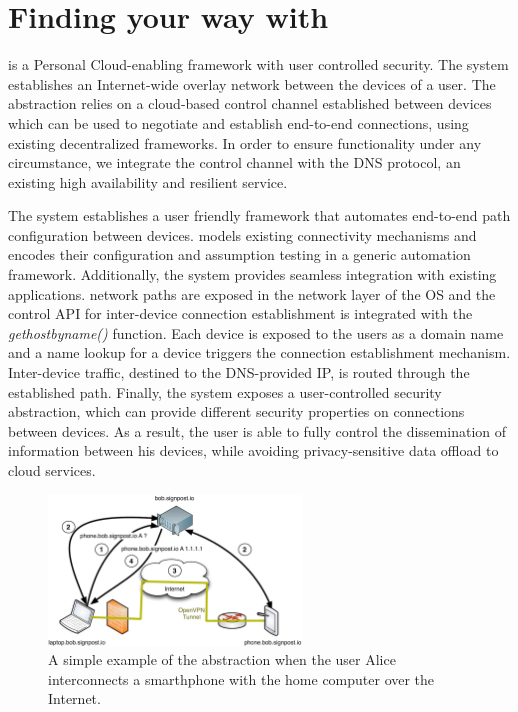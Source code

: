\section{Finding your way with \signpost}\label{sec:sp-signpost}

\signpost is a Personal Cloud-enabling framework with user controlled security.
The system establishes an Internet-wide overlay network between the devices of a
user. The abstraction relies on a cloud-based control channel established
between devices which can be used to negotiate and establish end-to-end
connections, using existing decentralized frameworks. In order to ensure
functionality under any circumstance, we integrate the control channel with the
DNS protocol, an existing high availability and resilient service. 

The system establishes a user friendly framework that automates end-to-end path
configuration between devices.  \signpost models existing connectivity
mechanisms and encodes their configuration and assumption testing in a generic
automation framework.  Additionally, the system provides seamless integration
with existing applications. \signpost network paths are exposed in the network
layer of the OS and  the control API for inter-device connection establishment
is integrated with the \textit{gethostbyname()} function.  Each device is
exposed to the users as a domain name and a name lookup for a device triggers
the connection establishment mechanism. Inter-device traffic, destined to the
DNS-provided IP, is routed through the established path.  Finally, the system
exposes a user-controlled security abstraction, which can provide different
security properties on connections between devices. As a result, the user is
able to fully control the dissemination of information between his devices,
while avoiding privacy-sensitive data offload to cloud services. 

\begin{figure}[ht]
  \begin{center}
	\includegraphics[width=0.6\textwidth]{Chapter3/Chapter3Figs/sp-illustration}
  \end{center}
  \caption{A simple example of the \signpost abstraction when the user Alice
    interconnects a smarthphone with the home computer over the Internet.}
  \label{fig:signpost-user-abstraction}
\end{figure}

